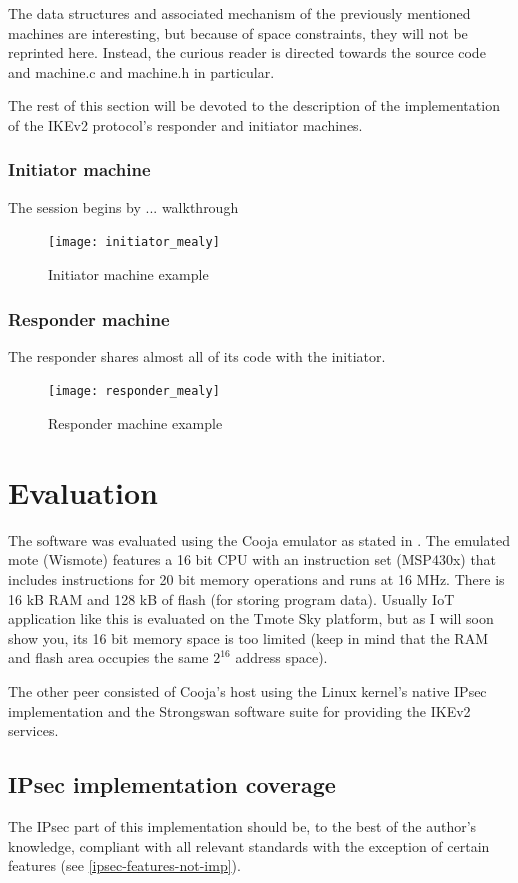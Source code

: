\documentclass[final,a4paper,twoside,11pt,onecolumn]{report}
\begin{document}
The data structures and associated mechanism of the previously mentioned machines are interesting, but because of space constraints, they will not be reprinted here. Instead, the curious reader is directed towards the source code and machine.c and machine.h in particular.

The rest of this section will be devoted to the description of the implementation of the IKEv2 protocol's responder and initiator machines.

\subsection{Initiator machine}
The session begins by ... walkthrough


\begin{figure}[h!]
   \texttt{[image: initiator\_mealy]}
   \caption{Initiator machine example}
   \label{fig:mealydemo}
\end{figure}

\subsection{Responder machine}
The responder shares almost all of its code with the initiator. 


\begin{figure}[h!]
   \texttt{[image: responder\_mealy]}
   \caption{Responder machine example}
   \label{fig:mealydemo}
\end{figure}


\chapter{Evaluation}
\label{cha:eval}
The software was evaluated using the Cooja emulator as stated in . The emulated mote (Wismote) features a 16 bit CPU with an instruction set (MSP430x) that includes instructions for 20 bit memory operations and runs at 16 MHz. There is 16 kB RAM and 128 kB of flash (for storing program data). Usually IoT application like this is evaluated on the Tmote Sky platform, but as I will soon show you, its 16 bit memory space is too limited (keep in mind that the RAM and flash area occupies the same $2^16$ address space).

The other peer consisted of Cooja's host using the Linux kernel's native IPsec implementation and the Strongswan software suite for providing the IKEv2 services.

\section{IPsec implementation coverage}
The IPsec part of this implementation should be, to the best of the author's knowledge, compliant with all relevant standards with the exception of certain features (see \ref{ipsec-features-not-imp}).
\end{document}
